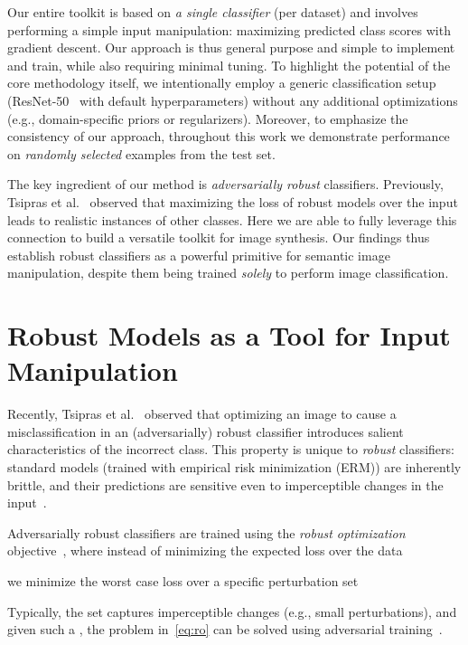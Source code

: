 \documentclass{article}
\begin{document}
Our entire toolkit is based on {\em a single classifier} (per dataset)
and involves performing a simple input
manipulation: maximizing predicted class scores with gradient descent.
Our approach is thus general purpose and simple to implement and train, 
while also requiring minimal tuning.
To highlight the potential of the core methodology itself, 
we intentionally employ a generic classification setup
(ResNet-50~\cite{he2016deep} with default hyperparameters) without any
additional optimizations (e.g., domain-specific priors or regularizers).
Moreover, to emphasize the consistency of our approach,
throughout this work we demonstrate performance on {\em randomly selected}
examples from the test set.

The key ingredient of our method is {\em
adversarially robust} classifiers.
Previously, Tsipras et al.~\cite{tsipras2019robustness} observed that maximizing
the loss of  robust models over the input leads to realistic
instances of other classes.
Here we are able to fully leverage this connection to build a versatile toolkit
for image synthesis.
Our findings thus establish robust classifiers as a powerful primitive
for semantic image manipulation, despite them being trained {\em solely} to perform image 
classification.
 
\section{Robust Models as a Tool for Input Manipulation}
\label{sec:grad}
Recently, Tsipras et al.~\cite{tsipras2019robustness} observed 
that optimizing an image to cause a misclassification in an (adversarially)
robust classifier introduces salient characteristics of the 
incorrect class.  This property is unique to {\em robust} classifiers: 
standard models (trained with empirical risk minimization (ERM)) are 
inherently brittle, and their predictions are sensitive even to 
imperceptible changes in the input~\cite{szegedy2014intriguing}.

Adversarially robust classifiers are trained using the {\em robust 
optimization} objective~\cite{wald1945statistical,madry2018towards}, where instead of
minimizing the expected loss  over the data

we minimize the worst case loss over a specific perturbation 
set 

Typically, the set  captures
imperceptible changes (e.g., small  perturbations), 
and given such a , the problem in~\eqref{eq:ro} can be solved using adversarial 
training~\cite{goodfellow2015explaining,madry2018towards}.
\end{document}
